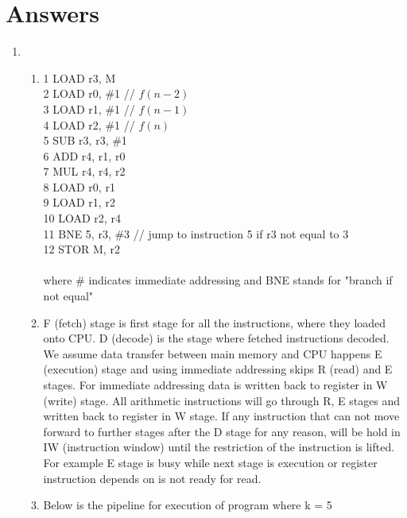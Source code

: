 \documentclass[12pt]{article}
\begin{document}
    \section*{Answers}
    \begin{enumerate}
        \item 
        \begin{enumerate}
            \item 1 LOAD r3, M\\
            2 LOAD r0, \#1  \hspace{1cm}// $f(n - 2)$\\
            3 LOAD r1, \#1 \hspace{1cm} // $f(n-1)$\\
            4 LOAD r2, \#1 \hspace{1cm} // $f(n)$\\
            5 SUB r3, r3, \#1\\
            6 ADD r4, r1, r0\\
            7 MUL r4, r4, r2\\
            8 LOAD r0, r1\\
            9 LOAD r1, r2\\
            10 LOAD r2, r4\\
            11 BNE 5, r3, \#3 \hspace{0.5cm} // jump to instruction 5 if r3 not equal to 3\\
            12 STOR M, r2\\
            \\
            where \# indicates immediate addressing and BNE stands for "branch if not equal"
            \\
            \item F (fetch) stage is first stage for all the instructions, where they loaded onto CPU. D (decode) is the stage where fetched instructions decoded. We assume data transfer between main memory and CPU happens E (execution) stage and using immediate addressing skips R (read) and E stages. For immediate addressing data is written back to register in W (write) stage. All arithmetic instructions will go through R, E stages and written back to register in W stage. If any instruction that can not move forward to further stages after the D stage for any reason, will be hold in IW (instruction window) until the restriction of the instruction is lifted. For example E stage is busy while next stage is execution or register instruction depends on is not ready for read.
            \clearpage
            \item Below is the pipeline for execution of program where k = 5

\end{enumerate}
\end{enumerate}
\end{document}
